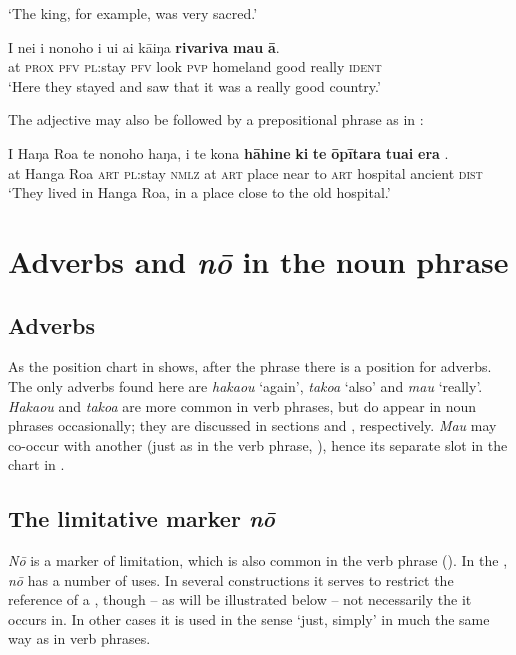 \glt 
‘The king, for example, was very sacred.’ \textstyleExampleref{[R371.009]} 
\z

\ea\label{ex:5.142}
\gll {\ꞌ}I nei i nonoho i u{\ꞌ}i ai kāiŋa \textbf{rivariva} \textbf{mau} \textbf{{\ꞌ}ā}. \\
at \textsc{prox} \textsc{pfv} \textsc{pl}:stay \textsc{pfv} look \textsc{pvp} homeland good really \textsc{ident} \\

\glt
‘Here they stayed and saw that it was a really good country.’ \textstyleExampleref{[R420.054]} 
\z

The adjective may also be followed by a prepositional phrase as in :

\ea\label{ex:5.143}
\gll {\ꞌ}I Haŋa Roa te nonoho haŋa, {\ꞌ}i te kona {\ob}\textbf{hāhine}   {\ob}\textbf{ki} \textbf{te} \textbf{{\ꞌ}ōpītara} \textbf{tuai} \textbf{era}\,{\cb}\,{\cb}.\\
at Hanga Roa \textsc{art} \textsc{pl}:stay \textsc{nmlz} at \textsc{art} place {\db}near {\db}to \textsc{art} hospital ancient \textsc{dist}\\

\glt 
‘They lived in Hanga Roa, in a place close to the old hospital.’ \textstyleExampleref{[R380.003]} 
\z{}
\section{Adverbs and \textit{nō} in the noun phrase}\label{sec:5.8}
\subsection{Adverbs}\label{sec:5.8.1}
As the position chart in  shows, after the  phrase there is a position for adverbs. The only adverbs found here are \textit{haka{\ꞌ}ou} ‘again’, \textit{tako{\ꞌ}a} ‘also’ and \textit{mau} ‘really’. \textit{Haka{\ꞌ}ou} and \textit{tako{\ꞌ}a} are more common in verb phrases, but do appear in noun phrases occasionally; they are discussed in sections  and , respectively. \textit{Mau} may co-occur with another  (just as in the verb phrase, ), hence its separate slot in the  chart in .

\subsection{The limitative marker \textit{nō}}\label{sec:5.8.2}
\textit{Nō} is a marker of limitation, which is also common in the verb phrase (). In the , \textit{nō} has a number of uses. In several constructions it serves to restrict the reference of a , though – as will be illustrated below – not necessarily the  it occurs in. In other cases it is used in the sense ‘just, simply’ in much the same way as in verb phrases.

